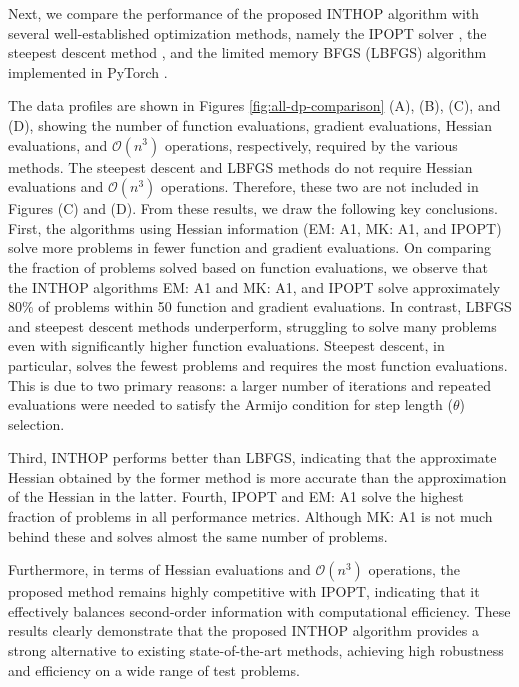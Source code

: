 \documentclass{elsarticle}
\numberwithin{equation}{section}
\begin{document}
{Next, we compare the performance of the proposed INTHOP algorithm with several well-established optimization methods, namely the IPOPT solver \cite{wachter2006implementation}, the steepest descent method \cite{nocedal1999numerical}, and the limited memory BFGS (LBFGS) algorithm implemented in PyTorch \cite{paszke2019pytorch}.

The data profiles are shown in Figures \ref{fig:all-dp-comparison} (A), (B), (C), and (D), showing the number of function evaluations, gradient evaluations, Hessian evaluations, and $\mathcal{O}(n^3)$ operations, respectively, required by the various methods. The steepest descent and LBFGS methods do not require Hessian evaluations and $\mathcal{O}(n^3)$ operations. Therefore, these two are not included in Figures (C) and (D). From these results, we draw the following key conclusions. 
First, the algorithms using Hessian information (EM: A1, MK: A1, and IPOPT) solve more problems in fewer function and gradient evaluations. On comparing the fraction of problems solved based on function evaluations, we observe that the INTHOP algorithms EM: A1 and MK: A1, and IPOPT solve approximately 80\% of problems within 50 function and gradient evaluations. In contrast, LBFGS and steepest descent methods underperform, struggling to solve many problems even with significantly higher function evaluations. Steepest descent, in particular, solves the fewest problems and requires the most function evaluations. This is due to two primary reasons: a larger number of iterations and repeated evaluations were needed to satisfy the Armijo condition for step length ($\theta$) selection. 

Third, INTHOP performs better than LBFGS, indicating that the approximate Hessian obtained by the former method is more accurate than the approximation of the Hessian in the latter. Fourth, IPOPT and EM: A1  solve the highest fraction of problems in all performance metrics. Although MK: A1 is not much behind these and solves almost the same number of problems. 

Furthermore, in terms of Hessian evaluations and $\mathcal{O}(n^3)$ operations, the proposed method remains highly competitive with IPOPT, indicating that it effectively balances second-order information with computational efficiency. These results clearly demonstrate that the proposed INTHOP algorithm provides a strong alternative to existing state-of-the-art methods, achieving high robustness and efficiency on a wide range of test problems.}
\end{document}
